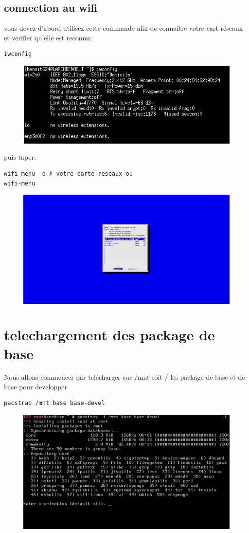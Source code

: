 \documentclass[a4paper]{book}
\begin{document}
\section{connection au wifi}
vous devez d'abord utilisez cette commande afin de connaitre votre cart
réseaux et verifier qu'elle est reconnu:
\begin{verbatim}
iwconfig
\end{verbatim}
\begin{figure}[h]
  \includegraphics[width=13cm]{images/iwconfig}
\end{figure}
puis taper:
\begin{verbatim}
wifi-menu -o # votre carte reseaux ou
wifi-menu
\end{verbatim}
\begin{figure}[h]
  \includegraphics[width=13cm]{images/wifi-menu}
\end{figure}
\chapter{telechargement des package de base}
Nous allons commencer par telecharger sur /mnt soit / les package de base et de
base pour developper 
\begin{verbatim}
pacstrap /mnt base base-devel
\end{verbatim}
\begin{figure}[h]
  \includegraphics[width=13cm]{images/pacstrapbase}
\end{figure}
\end{document}
